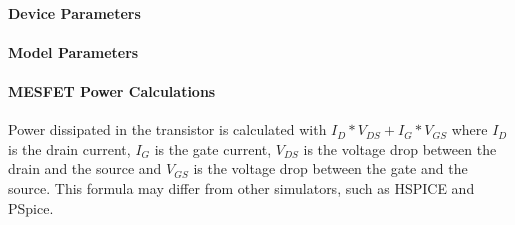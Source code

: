 \pagebreak

\paragraph{Device Parameters}


\paragraph{Model Parameters}


\paragraph{MESFET Power Calculations}
Power dissipated in the transistor is calculated with $I_{D}*V_{DS}+I_{G}*V_{GS}$ where
$I_{D}$ is the drain current, $I_{G}$ is the gate current, $V_{DS}$ is the 
voltage drop between the drain and the source and $V_{GS}$ is the voltage drop 
between the gate and the source. This formula may differ from other simulators,
such as HSPICE and PSpice.
